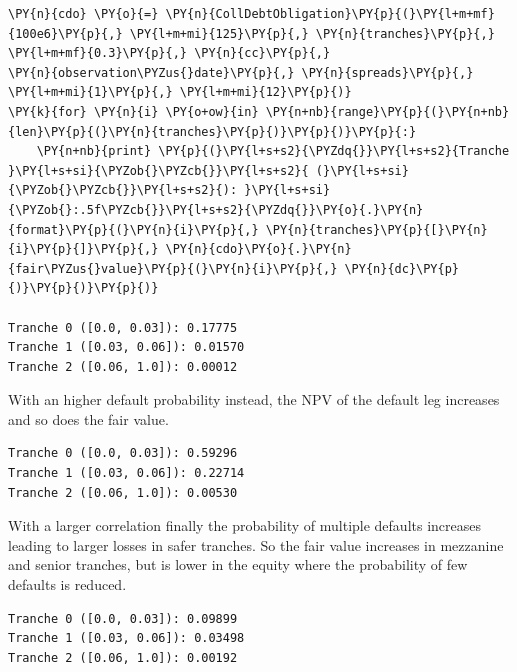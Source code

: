 \begin{Answer}
\begin{tcolorbox}[size=fbox, boxrule=1pt, colback=cellbackground, colframe=cellborder]
\begin{Verbatim}[commandchars=\\\{\}]
\PY{n}{cdo} \PY{o}{=} \PY{n}{CollDebtObligation}\PY{p}{(}\PY{l+m+mf}{100e6}\PY{p}{,} \PY{l+m+mi}{125}\PY{p}{,} \PY{n}{tranches}\PY{p}{,} \PY{l+m+mf}{0.3}\PY{p}{,} \PY{n}{cc}\PY{p}{,}
\PY{n}{observation\PYZus{}date}\PY{p}{,} \PY{n}{spreads}\PY{p}{,} \PY{l+m+mi}{1}\PY{p}{,} \PY{l+m+mi}{12}\PY{p}{)}
\PY{k}{for} \PY{n}{i} \PY{o+ow}{in} \PY{n+nb}{range}\PY{p}{(}\PY{n+nb}{len}\PY{p}{(}\PY{n}{tranches}\PY{p}{)}\PY{p}{)}\PY{p}{:}
    \PY{n+nb}{print} \PY{p}{(}\PY{l+s+s2}{\PYZdq{}}\PY{l+s+s2}{Tranche }\PY{l+s+si}{\PYZob{}\PYZcb{}}\PY{l+s+s2}{ (}\PY{l+s+si}{\PYZob{}\PYZcb{}}\PY{l+s+s2}{): }\PY{l+s+si}{\PYZob{}:.5f\PYZcb{}}\PY{l+s+s2}{\PYZdq{}}\PY{o}{.}\PY{n}{format}\PY{p}{(}\PY{n}{i}\PY{p}{,} \PY{n}{tranches}\PY{p}{[}\PY{n}{i}\PY{p}{]}\PY{p}{,} \PY{n}{cdo}\PY{o}{.}\PY{n}{fair\PYZus{}value}\PY{p}{(}\PY{n}{i}\PY{p}{,} \PY{n}{dc}\PY{p}{)}\PY{p}{)}\PY{p}{)}
	
Tranche 0 ([0.0, 0.03]): 0.17775
Tranche 1 ([0.03, 0.06]): 0.01570
Tranche 2 ([0.06, 1.0]): 0.00012
\end{Verbatim}
\end{tcolorbox}

With an higher default probability instead, the NPV of the default leg increases and so does the fair value.

\begin{tcolorbox}[size=fbox, boxrule=1pt, colback=cellbackground, colframe=cellborder]
\begin{Verbatim}[commandchars=\\\{\}]
Tranche 0 ([0.0, 0.03]): 0.59296
Tranche 1 ([0.03, 0.06]): 0.22714
Tranche 2 ([0.06, 1.0]): 0.00530
\end{Verbatim}
\end{tcolorbox}

With a larger correlation finally the probability of multiple defaults increases leading to larger losses in safer tranches. So the fair value increases in mezzanine and senior tranches, but is lower in the equity where the probability of few defaults is reduced.

\begin{tcolorbox}[size=fbox, boxrule=1pt, colback=cellbackground, colframe=cellborder]
\begin{Verbatim}[commandchars=\\\{\}]
Tranche 0 ([0.0, 0.03]): 0.09899
Tranche 1 ([0.03, 0.06]): 0.03498
Tranche 2 ([0.06, 1.0]): 0.00192
\end{Verbatim}
\end{tcolorbox}
\end{Answer}
